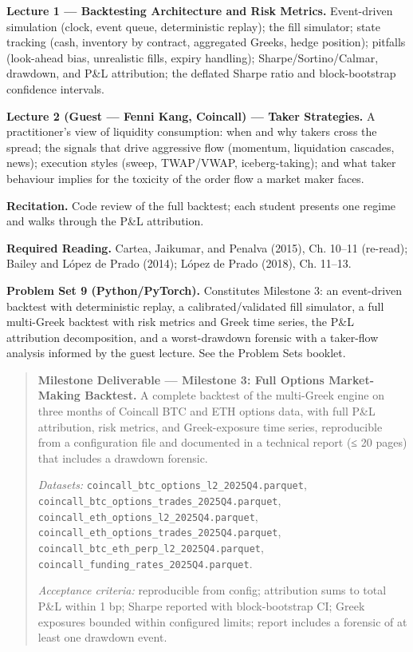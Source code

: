 \documentclass[
]{article}
\begin{document}
\textbf{Lecture 1 --- Backtesting Architecture and Risk Metrics.}
Event-driven simulation (clock, event queue, deterministic replay); the
fill simulator; state tracking (cash, inventory by contract, aggregated
Greeks, hedge position); pitfalls (look-ahead bias, unrealistic fills,
expiry handling); Sharpe/Sortino/Calmar, drawdown, and P\&L attribution;
the deflated Sharpe ratio and block-bootstrap confidence intervals.

\textbf{Lecture 2 (Guest --- Fenni Kang, Coincall) --- Taker
Strategies.} A practitioner's view of liquidity consumption: when and
why takers cross the spread; the signals that drive aggressive flow
(momentum, liquidation cascades, news); execution styles (sweep,
TWAP/VWAP, iceberg-taking); and what taker behaviour implies for the
toxicity of the order flow a market maker faces.

\textbf{Recitation.} Code review of the full backtest; each student
presents one regime and walks through the P\&L attribution.

\textbf{Required Reading.} Cartea, Jaikumar, and Penalva (2015), Ch.
10--11 (re-read); Bailey and López de Prado (2014); López de Prado
(2018), Ch. 11--13.

\textbf{Problem Set 9 (Python/PyTorch).} Constitutes Milestone 3: an
event-driven backtest with deterministic replay, a calibrated/validated
fill simulator, a full multi-Greek backtest with risk metrics and Greek
time series, the P\&L attribution decomposition, and a worst-drawdown
forensic with a taker-flow analysis informed by the guest lecture. See
the Problem Sets booklet.

\begin{quote}
\textbf{Milestone Deliverable --- Milestone 3: Full Options
Market-Making Backtest.} A complete backtest of the multi-Greek engine
on three months of Coincall BTC and ETH options data, with full P\&L
attribution, risk metrics, and Greek-exposure time series, reproducible
from a configuration file and documented in a technical report (≤ 20
pages) that includes a drawdown forensic.

\emph{Datasets:} \texttt{coincall\_btc\_options\_l2\_2025Q4.parquet},
\texttt{coincall\_btc\_options\_trades\_2025Q4.parquet},
\texttt{coincall\_eth\_options\_l2\_2025Q4.parquet},
\texttt{coincall\_eth\_options\_trades\_2025Q4.parquet},
\texttt{coincall\_btc\_eth\_perp\_l2\_2025Q4.parquet},
\texttt{coincall\_funding\_rates\_2025Q4.parquet}.

\emph{Acceptance criteria:} reproducible from config; attribution sums
to total P\&L within 1 bp; Sharpe reported with block-bootstrap CI;
Greek exposures bounded within configured limits; report includes a
forensic of at least one drawdown event.
\end{quote}
\end{document}
